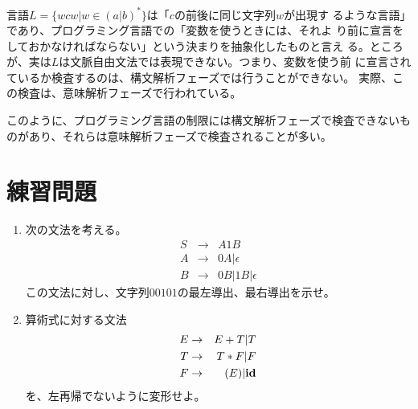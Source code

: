 \documentclass[a4j,11pt]{jsarticle}
\begin{document}
言語$L = \{wcw | w \in (a | b)^* \}$は「$c$の前後に同じ文字列$w$が出現す
るような言語」であり、プログラミング言語での「変数を使うときには、それよ
り前に宣言をしておかなければならない」という決まりを抽象化したものと言え
る。ところが、実は$L$は文脈自由文法では表現できない。つまり、変数を使う前
に宣言されているか検査するのは、構文解析フェーズでは行うことができない。
実際、この検査は、意味解析フェーズで行われている。

このように、プログラミング言語の制限には構文解析フェーズで検査できないも
のがあり、それらは意味解析フェーズで検査されることが多い。

\section*{練習問題}

\begin{enumerate}
 \item 次の文法を考える。
       \begin{eqnarray*}
	S & \rightarrow & A1B \\
	A & \rightarrow & 0A | \epsilon \\
	B & \rightarrow & 0B | 1B | \epsilon
       \end{eqnarray*}
       この文法に対し、文字列$00101$の最左導出、最右導出を示せ。
 \item 算術式に対する文法
       \begin{eqnarray*}
	E & \rightarrow & E + T | T \\
	T & \rightarrow & T * F | F \\
	F & \rightarrow & (E) | {\bf id}
       \end{eqnarray*}
       を、左再帰でないように変形せよ。
\end{enumerate}
\end{document}

